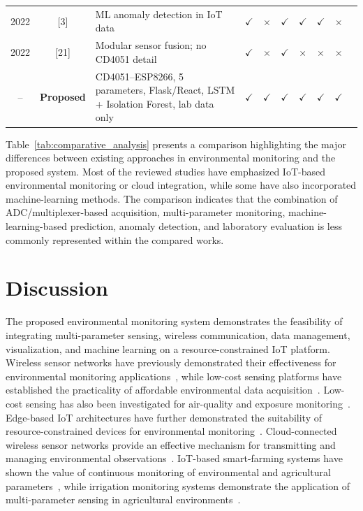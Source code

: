 ﻿\documentclass[journal]{IEEEtran}
\begin{document}
\begin{table}[!h]
\begin{tabular}{c c p{4.0cm} c c c c c c c}
        2022 & [3] &
        ML anomaly detection in IoT data &
        $\checkmark$ & $\times$ & $\checkmark$ &
        $\checkmark$ & $\checkmark$ & $\times$ \\

        2022 & [21] &
        Modular sensor fusion; no CD4051 detail &
        $\checkmark$ & $\times$ & $\checkmark$ &
        $\times$ & $\times$ & $\times$ \\

        -- & \textbf{Proposed} &
        CD4051--ESP8266, 5 parameters, Flask/React,
        LSTM + Isolation Forest, lab data only &
        $\checkmark$ & $\checkmark$ & $\checkmark$ &
        $\checkmark$ & $\checkmark$ & $\checkmark$ \\

        \bottomrule
    \end{tabular}
\end{table}

Table~\ref{tab:comparative_analysis} presents a comparison highlighting the
major differences between existing approaches in environmental monitoring
and the proposed system. Most of the reviewed studies have emphasized
IoT-based environmental monitoring or cloud integration, while some have
also incorporated machine-learning methods. The comparison indicates that
the combination of ADC/multiplexer-based acquisition, multi-parameter
monitoring, machine-learning-based prediction, anomaly detection, and
laboratory evaluation is less commonly represented within the compared
works.

\section{Discussion}

The proposed environmental monitoring system demonstrates the feasibility of
integrating multi-parameter sensing, wireless communication, data management,
visualization, and machine learning on a resource-constrained IoT platform.
Wireless sensor networks have previously demonstrated their effectiveness for
environmental monitoring applications~\cite{ref13}, while low-cost sensing
platforms have established the practicality of affordable environmental data
acquisition~\cite{ref14}. Low-cost sensing has also been investigated for
air-quality and exposure monitoring~\cite{ref15}. Edge-based IoT architectures
have further demonstrated the suitability of resource-constrained devices for
environmental monitoring~\cite{ref16}. Cloud-connected wireless sensor networks
provide an effective mechanism for transmitting and managing environmental
observations~\cite{ref17}. IoT-based smart-farming systems have shown the value
of continuous monitoring of environmental and agricultural parameters~\cite{ref18},
while irrigation monitoring systems demonstrate the application of
multi-parameter sensing in agricultural environments~\cite{ref19}.
\end{document}
